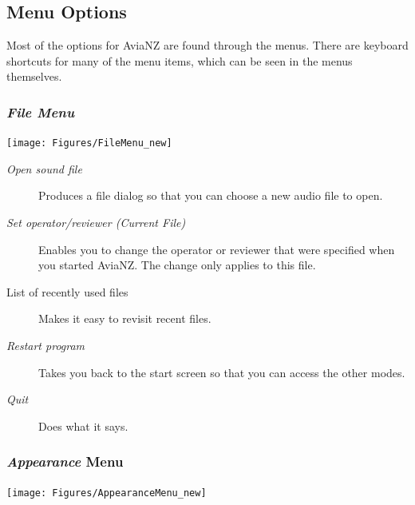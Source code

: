 \documentclass{scrartcl}
\begin{document}
\subsection{Menu Options}	

Most of the options for AviaNZ are found through the menus. There are keyboard shortcuts for many of the menu items, which can be seen in the menus themselves. 

\subsubsection{\textit{File Menu}}

\begin{center}
\texttt{[image: Figures/FileMenu\_new]}
\end{center}

\begin{description}
	\item[\textit{Open sound file}] Produces a file dialog so that you can choose a new audio file to open.
	\item[\textit{Set operator/reviewer (Current File)}] Enables you to change the operator or reviewer that were specified when you started AviaNZ. The change only applies to this file. 
\item[List of recently used files] Makes it easy to revisit recent files.
\item[\textit{Restart program}] Takes you back to the start screen so that you can access the other modes.
\item[\textit{Quit}] Does what it says.
\end{description}

\subsubsection{\textit{Appearance} Menu}

\begin{center}
\texttt{[image: Figures/AppearanceMenu\_new]}
\end{center}
\end{document}
